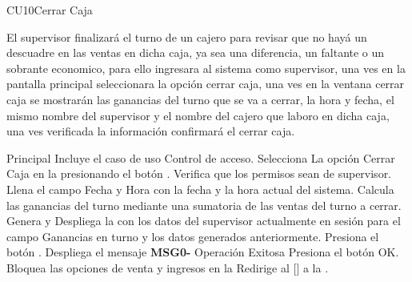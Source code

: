 \begin{UseCase}{CU10}{Cerrar Caja}{
		El supervisor finalizará el turno de un cajero para revisar que no hayá un descuadre en las ventas en dicha caja, ya sea una diferencia, un faltante o un sobrante economico, para ello ingresara al sistema como supervisor, una ves en la pantalla principal seleccionara la opción cerrar caja, una ves en la ventana cerrar caja se mostrarán las ganancias del turno que se va a cerrar, la hora y fecha, el mismo nombre del supervisor y el nombre del cajero que laboro en dicha caja, una ves verificada la información confirmará el cerrar caja.

	}
	\end{UseCase}
	\begin{UCtrayectoria}{Principal}
		\UCpaso Incluye el caso de uso  Control de acceso.
		\UCpaso[\UCactor] Selecciona La opción Cerrar Caja en la  presionando el botón .
		\UCpaso Verifica que los permisos sean de supervisor. 
		\UCpaso Llena el campo Fecha y Hora con la fecha y la hora actual del sistema. 
		\UCpaso Calcula las ganancias del turno mediante una sumatoria de las ventas del turno a cerrar.
		\UCpaso Genera y Despliega la  con los datos del supervisor actualmente en sesión para el campo Ganancias en turno y los datos generados anteriormente.
		\UCpaso [\UCactor] Presiona el botón . 
		\UCpaso Despliega el mensaje {\bf MSG0-} {Operación Exitosa}
		\UCpaso [\UCactor] Presiona el botón {OK}.
		\UCpaso Bloquea las opciones de venta y ingresos en la 
		\UCpaso Redirige al [\UCactor] a la .
	\end{UCtrayectoria}


